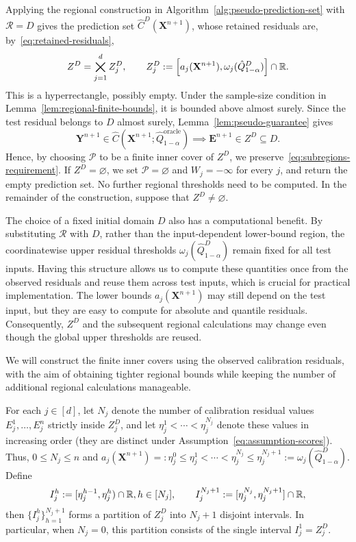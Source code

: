 Applying the regional construction in Algorithm~\ref{alg:pseudo-prediction-set} with $\mathcal R=D$ gives the prediction set $\hat C^D(\mathbf X^{n+1})$, whose retained residuals are, by~\eqref{eq:retained-residuals},
\[
Z^D
=
\bigtimes_{j=1}^d Z_j^D,
\qquad
Z_j^D:=
\left[
a_j(\mathbf X^{n+1}),
\omega_j(\hat Q^D_{1-\alpha})
\right]\cap\mathbb{R}.
\]
This is a hyperrectangle, possibly empty. Under the sample-size condition in Lemma~\ref{lem:regional-finite-bounds}, it is bounded above almost surely. Since the test residual belongs to $D$ almost surely, Lemma~\ref{lem:pseudo-guarantee} gives
\[
\mathbf Y^{n+1}\in
\hat C(\mathbf X^{n+1};\hat Q^{\mathrm{oracle}}_{1-\alpha})
\implies
\mathbf E^{n+1}\in Z^D\subseteq D.
\]
Hence, by choosing $\mathcal P$ to be a finite inner cover of $Z^D$, we preserve~\eqref{eq:subregions-requirement}. If $Z^D=\varnothing$, we set $\mathcal P=\varnothing$ and $W_j=-\infty$ for every $j$, and return the empty prediction set. No further regional thresholds need to be computed. In the remainder of the construction, suppose that $Z^D\neq\varnothing$.

{\color{brown}
The choice of a fixed initial domain $D$ also has a computational benefit. By substituting $\mathcal R$ with $D$, rather than the input-dependent lower-bound region, the coordinatewise upper residual thresholds $\omega_j(\hat Q^D_{1-\alpha})$ remain fixed for all test inputs. Having this structure allows us to compute these quantities once from the observed residuals and reuse them across test inputs, which is crucial for practical implementation. The lower bounds $a_j(\mathbf X^{n+1})$ may still depend on the test input, but they are easy to compute for absolute and quantile residuals. Consequently, $Z^D$ and the subsequent regional calculations may change even though the global upper thresholds are reused.
}

We will construct the finite inner covers using the observed calibration residuals, with the aim of obtaining tighter regional bounds while keeping the number of additional regional calculations manageable.

For each $j\in[d]$, let $N_j$ denote the number of calibration residual values $E_j^1,\ldots,E_j^n$ strictly inside $Z_j^D$, and let
$\eta_j^1<\cdots<\eta_j^{N_j}$
denote these values in increasing order (they are distinct under Assumption~\ref{eq:assumption-scores}). Thus, $0\leq N_j\leq n$ and
$a_j(\mathbf X^{n+1})=:
\eta_j^0\leq \eta_j^1<\cdots<
\eta_j^{N_j}\leq \eta_j^{N_j+1}:=\omega_j(\hat Q^D_{1-\alpha}).$
Define
\begin{equation}\label{eq:interval-partition}
    I_j^h:=[\eta_j^{h-1},\eta_j^h)\cap\mathbb{R}, h \in [N_j],\qquad I_j^{N_j+1}:=
    [\eta_j^{N_j},\eta_j^{N_j+1}] \cap \mathbb{R},
\end{equation}
then
$\{I_j^h\}^{N_j+1}_{h=1}$
forms a partition of $Z_j^D$ into $N_j+1$ disjoint intervals. In particular, when $N_j=0$, this partition consists of the single interval $I_j^1=Z_j^D$.

